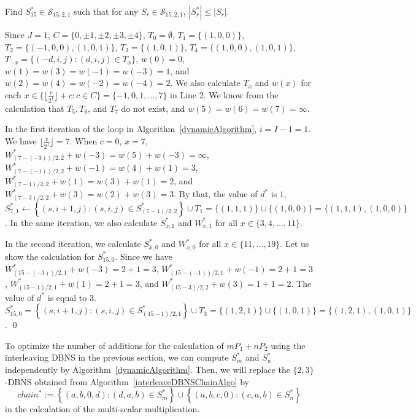 \begin{example} Find $S^*_{15} \in \mathcal{S}_{15, 2, 1}$ such that for any $S_r \in \mathcal{S}_{15, 2, 1}$, $|S^*_r| \leq |S_r|$. 

 Since $J = 1$, $C = \{0, \pm 1, \pm 2, \pm 3, \pm 4\}$, $T_0 = \emptyset$, $T_1 = \{(1,0,0)\}$, $T_2 =\{(-1,0,0), (1,0,1)\}$, $T_3 = \{(1,0,1)\}$, $T_4 = \{(1,0,0),(1,0,1)\}$, $T_{-x} = \{(-d, i, j) : (d, i, j) \in T_x\}$, $w(0) = 0$, $w(1) = w(3) = w(-1) = w(-3) = 1$, and $w(2) = w(4) = w(-2) = w(-4) = 2$. We also calculate $T_x$ and $w(x)$ for each $x \in \{ \lfloor \frac{r}{2^I} \rfloor + c : c \in C \} = \{ -1, 0, 1, \dots, 7 \}$ in Line 2. We know from the calculation that $T_5, T_6$, and $T_7$ do not exist, and $w(5) = w(6) = w(7) = \infty$.

In the first iteration of the loop in Algorithm~\ref{dynamicAlgorithm}, $i = I - 1 = 1$. We have $\lfloor \frac{r}{2^1} \rfloor = 7$. When $c = 0$, $x = 7$,  $W^*_{(7 - (-3)) / 2,2} + w(-3) = w(5) + w(-3) = \infty$, $W^*_{(7 - (-1)) / 2,2} + w(-1) = w(4) + w(1) = 3$, $W^*_{(7 - 1) / 2,2} + w(1) = w(3) + w(1) = 2$, and $W^*_{(7-3)/2, 2} + w(3) = w(2) + w(3) = 3$. By that, the value of $d^*$ is $1$, $S^*_{7, 1} \leftarrow \left\{(s,i+1,j) : (s,i,j) \in S^*_{(7-1) / 2, 2}\right\} \cup T_1 = \{ (1,1,1) \} \cup \{ (1,0,0)\} = \{ (1,1,1), (1,0,0) \}$. In the same iteration, we also calculate $S^*_{x,1}$ and $W^*_{x,1}$ for all $x \in \{ 3, 4, \dots, 11 \}$.

In the second iteration, we calculate $S^*_{x,0}$ and $W^*_{x,0}$ for all $x \in \{ 11, \dots, 19 \}$. Let us show the calculation for $S^*_{15,0}$. Since we have $W^*_{(15 - (-3)) / 2,1} + w(-3) = 2 + 1 = 3$, $W^*_{(15 - (-1)) / 2,1} + w(-1) = 2 + 1 = 3$, $W^*_{(15 - 1) / 2,1} + w(1) = 2 + 1 = 3$, and $W^*_{(15-3)/2, 2} + w(3) = 1 + 1 = 2$. The value of $d^*$ is equal to $3$. $S^*_{15,0} = \left\{(s,i+1,j) : (s,i,j) \in S^*_{(15-1) / 2, 1}\right\} \cup T_3 = \{(1,2,1)\} \cup \{(1,0,1)\} = \{(1,2,1), (1,0,1)\}$. \qed
\end{example}

To optimize the number of additions for the calculation of $mP_1 + nP_2$ using the interleaving DBNS in the previous section, we can compute $S_m^*$ and $S_n^*$ independently by Algorithm~\ref{dynamicAlgorithm}. Then, we will replace the $\{2,3\}$-DBNS obtained from Algorithm~\ref{interleaveDBNSChainAlgo} by
$$chain^* := \left\{ (a,b,0,d) : (d, a, b) \in S_m^* \right\} \cup \left\{ (a,b,c,0) : (c, a, b) \in S_n^* \right\}$$
in the calculation of the multi-scalar multiplication.

